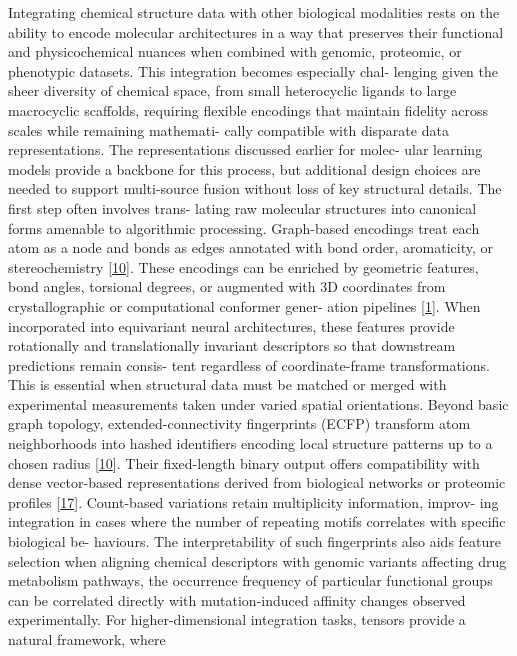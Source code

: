 \documentclass[
]{article}
\begin{document}
Integrating chemical structure data with other biological modalities
rests on the ability to encode molecular architectures in a way that
preserves their functional and physicochemical nuances when combined
with genomic, proteomic, or phenotypic datasets. This integration
becomes especially chal- lenging given the sheer diversity of chemical
space, from small heterocyclic ligands to large macrocyclic scaffolds,
requiring flexible encodings that maintain fidelity across scales while
remaining mathemati- cally compatible with disparate data
representations. The representations discussed earlier for molec- ular
learning models provide a backbone for this process, but additional
design choices are needed to support multi-source fusion without loss of
key structural details. The first step often involves trans- lating raw
molecular structures into canonical forms amenable to algorithmic
processing. Graph-based encodings treat each atom as a node and bonds as
edges annotated with bond order, aromaticity, or stereochemistry
{[}\protect\hyperlink{_bookmark50}{10}{]}. These encodings can be
enriched by geometric features, bond angles, torsional degrees, or
augmented with 3D coordinates from crystallographic or computational
conformer gener- ation pipelines
{[}\protect\hyperlink{_bookmark41}{1}{]}. When incorporated into
equivariant neural architectures, these features provide rotationally
and translationally invariant descriptors so that downstream predictions
remain consis- tent regardless of coordinate-frame transformations. This
is essential when structural data must be matched or merged with
experimental measurements taken under varied spatial orientations.
Beyond basic graph topology, extended-connectivity fingerprints (ECFP)
transform atom neighborhoods into hashed identifiers encoding local
structure patterns up to a chosen radius
{[}\protect\hyperlink{_bookmark50}{10}{]}. Their fixed-length binary
output offers compatibility with dense vector-based representations
derived from biological networks or proteomic profiles
{[}\protect\hyperlink{_bookmark57}{17}{]}. Count-based variations retain
multiplicity information, improv- ing integration in cases where the
number of repeating motifs correlates with specific biological be-
haviours. The interpretability of such fingerprints also aids feature
selection when aligning chemical descriptors with genomic variants
affecting drug metabolism pathways, the occurrence frequency of
particular functional groups can be correlated directly with
mutation-induced affinity changes observed experimentally. For
higher-dimensional integration tasks, tensors provide a natural
framework, where
\end{document}
